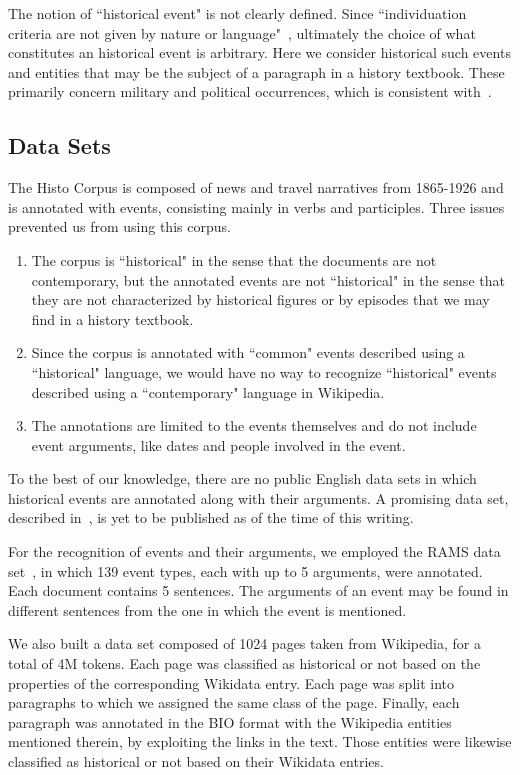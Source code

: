 \documentclass[runningheads]{llncs}
\begin{document}
The notion of “historical event" is not clearly defined. Since “individuation criteria are not given by nature or language"~\cite{shaw-2010-phdthesis}, ultimately the choice of what constitutes an historical event is arbitrary. Here we consider historical such events and entities that may be the subject of a paragraph in a history textbook. These primarily concern military and political occurrences, which is consistent with~\cite{cybulska-vossen-2011-historical}.

\subsection{Data Sets}

The Histo Corpus is composed of news and travel narratives from 1865-1926 and is annotated with events, consisting mainly in verbs and participles. Three issues prevented us from using this corpus. 

\begin{enumerate}
    \item The corpus is “historical" in the sense that the documents are not contemporary, but the annotated events are not “historical" in the sense that they are not characterized by historical figures or by episodes that we may find in a history textbook. 
    \item Since the corpus is annotated with “common" events described using a “historical" language, we would have no way to recognize “historical" events described using a “contemporary" language in Wikipedia.
    \item The annotations are limited to the events themselves and do not include event arguments, like dates and people involved in the event.
\end{enumerate}

To the best of our knowledge, there are no public English data sets in which historical events are annotated along with their arguments. A promising data set, described in~\cite{lai-etal-2021-event}, is yet to be published as of the time of this writing.

For the recognition of events and their arguments, we employed the RAMS data set~\cite{ebner-etal-2020-rams}, in which 139 event types, each with up to 5 arguments, were annotated. Each document contains 5 sentences. The arguments of an event may be found in different sentences from the one in which the event is mentioned.

We also built a data set composed of 1024 pages taken from Wikipedia, for a total of 4M tokens. Each page was classified as historical or not based on the properties of the corresponding Wikidata entry. Each page was split into paragraphs to which we assigned the same class of the page. Finally, each paragraph was annotated in the BIO format with the Wikipedia entities mentioned therein, by exploiting the links in the text. Those entities were likewise classified as historical or not based on their Wikidata entries.
\end{document}
